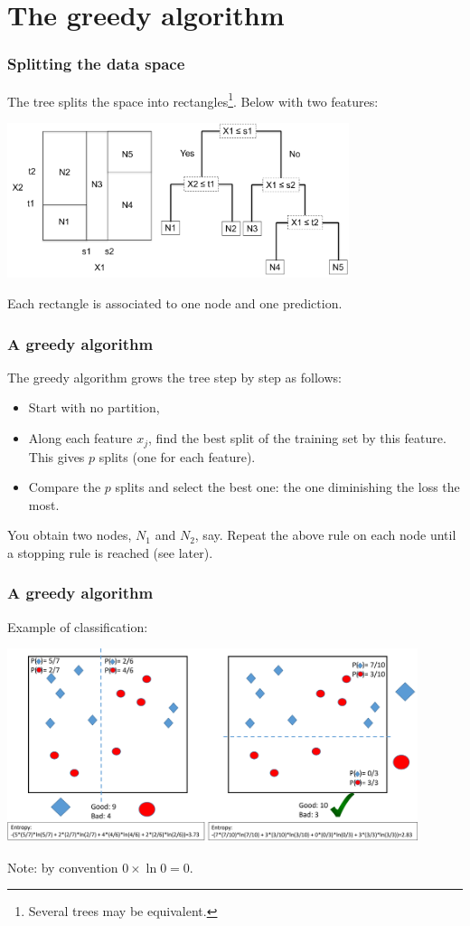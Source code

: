 \section{The greedy algorithm}
\begin{frame}
\frametitle{Splitting the data space}
The tree splits the space into rectangles\footnote{Several trees may be equivalent.}. Below with two features:
\begin{center}
\includegraphics[width=10cm]{../../Graphs/CART_Picture.png}
\end{center}
Each rectangle is associated to one node and one prediction. 
\end{frame}
\begin{frame}
\frametitle{A greedy algorithm}
The greedy algorithm grows the tree step by step as follows:
\begin{itemize}
\item Start with no partition, 
\item Along each feature $x_j$, find the best split of the training set by this feature. This gives $p$ splits (one for each feature).
\item Compare the $p$ splits and select the best one: the one diminishing the loss the most. 
\end{itemize}
You obtain two nodes, $N_1$ and $N_2$, say. Repeat the above rule on each node until a stopping rule is reached (see later).
\end{frame}
\begin{frame}
\frametitle{A greedy algorithm}
Example of classification:
\begin{center}
\includegraphics[width=12cm]{../../Graphs/Cart_Build.png}
\end{center}
\scriptsize
Note: by convention $0\times \ln 0 = 0$.
\normalsize
\end{frame}
